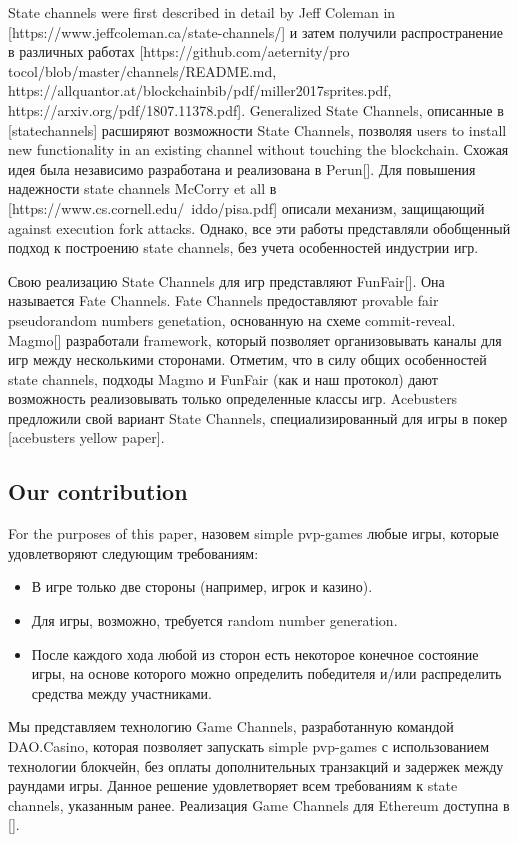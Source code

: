 	State channels were first described in detail by Jeff Coleman in [https://www.jeffcoleman.ca/state-channels/] и затем получили распространение в различных работах [https://github.com/aeternity/pro tocol/blob/master/channels/README.md, https://allquantor.at/blockchainbib/pdf/miller2017sprites.pdf, https://arxiv.org/pdf/1807.11378.pdf]. Generalized State Channels, описанные в [statechannels] расширяют возможности State Channels, позволяя users to install new functionality in an existing channel without touching the blockchain. Схожая идея была независимо разработана и реализована в Perun[].  Для повышения надежности state channels McCorry et all в [https://www.cs.cornell.edu/~iddo/pisa.pdf] описали механизм, защищающий against execution fork attacks. Однако, все эти работы представляли обобщенный подход к построению state channels, без учета особенностей индустрии игр. 

Свою реализацию State Channels для игр представляют FunFair[]. Она называется Fate Channels. Fate Channels предоставляют provable fair pseudorandom numbers genetation, основанную на схеме commit-reveal. Magmo[] разработали framework, который позволяет организовывать каналы для игр между несколькими сторонами. Отметим, что в силу общих особенностей state channels, подходы Magmo и FunFair (как и наш протокол) дают возможность реализовывать только определенные классы игр. Acebusters предложили свой вариант State Channels, специализированный для игры в покер [acebusters yellow paper].  

		\subsection {Our contribution}
	For the purposes of this paper, назовем simple pvp-games любые игры, которые удовлетворяют следующим требованиям:
	\begin{itemize}
		\item В игре только две стороны (например, игрок и казино).
		\item Для игры, возможно, требуется random number generation. 
		\item После каждого хода любой из сторон есть некоторое конечное состояние игры, на основе которого можно определить победителя и/или распределить средства между участниками. 
	\end{itemize}
	Мы представляем технологию Game Channels, разработанную командой DAO.Casino, которая позволяет запускать  simple pvp-games с использованием технологии блокчейн, без оплаты дополнительных транзакций и задержек между раундами игры. Данное решение удовлетворяет всем требованиям к state channels, указанным ранее. Реализация Game Channels для Ethereum доступна в [].

